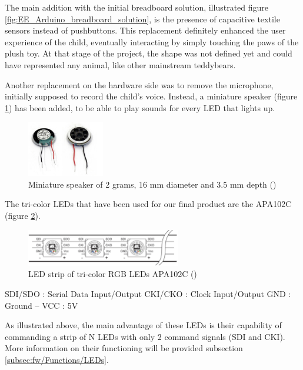 The main addition with the initial breadboard solution, illustrated figure \ref{fig:EE_Arduino_breadboard_solution}, is the presence of capacitive textile sensors instead of pushbuttons. This replacement definitely enhanced the user experience of the child, eventually interacting by simply touching the paws of the plush toy. At that stage of the project, the shape was not defined yet and could have represented any animal, like other mainstream teddybears.

\medskip Another replacement on the hardware side was to remove the microphone, initially supposed to record the child's voice. Instead, a miniature speaker (figure \ref{fig:MiniatureSpeaker}) has been added, to be able to play sounds for every LED that lights up. 

\begin{figure}[H]
    \centering
    \includegraphics[width=0.3\textwidth]{images/EE_MiniatureSpeaker.PNG}
    \caption{Miniature speaker of 2 grams, 16 mm diameter and 3.5 mm depth (\cite{minispeakerspec})}
    \label{fig:MiniatureSpeaker}
\end{figure}

The tri-color LEDs that have been used for our final product are the APA102C (figure \ref{fig:APA102C}).

\begin{figure}[H]
    \centering
    \includegraphics[width=0.6\textwidth]{images/EE_APA102C.PNG}
    \caption{LED strip of tri-color RGB LEDs APA102C (\cite{ledstripspec})}
    \label{fig:APA102C}
\end{figure}

\noindent SDI/SDO : Serial Data Input/Output \newline CKI/CKO : Clock Input/Output \newline GND : Ground -- VCC : 5V

\medskip As illustrated above, the main advantage of these LEDs is their capability of commanding a strip of N LEDs with only 2 command signals (SDI and CKI). More information on their functioning will be provided subsection \ref{subsec:fw/Functions/LEDs}.


